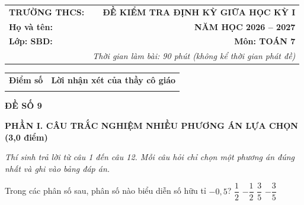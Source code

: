\documentclass[12pt,a4paper]{article}
\begin{document}
\noindent
\begin{tabularx}{\linewidth}{X r}
\textbf{TRƯỜNG THCS: \dotfill} & \textbf{ĐỀ KIỂM TRA ĐỊNH KỲ GIỮA HỌC KỲ I} \\
\textbf{Họ và tên: \dotfill} & \textbf{NĂM HỌC 2026 -- 2027} \\
\textbf{Lớp: \dotfill \quad SBD: \dotfill} & \textbf{Môn: TOÁN 7} \\
& \textit{Thời gian làm bài: 90 phút (không kể thời gian phát đề)}
\end{tabularx}

\vspace{1mm}
\noindent
\begin{tabularx}{\linewidth}{|p{3.5cm}|X|}
\hline
\centering\textbf{Điểm số} & \centering\textbf{Lời nhận xét của thầy cô giáo} \tabularnewline
\rule{0pt}{1.0cm} & \\
\hline
\end{tabularx}

\vspace{1.5mm}
\begin{center}
\textbf{\large ĐỀ SỐ 9}
\end{center}

\noindent\textbf{\large PHẦN I. CÂU TRẮC NGHIỆM NHIỀU PHƯƠNG ÁN LỰA CHỌN (3,0 điểm)}

\textit{Thí sinh trả lời từ câu 1 đến câu 12. Mỗi câu hỏi chỉ chọn một phương án đúng nhất và ghi vào bảng đáp án.}

\vspace{1mm}
\begin{ex}
Trong các phân số sau, phân số nào biểu diễn số hữu tỉ $-0{,}5$?
\choice
{$\dfrac{1}{2}$}
{\True $-\dfrac{1}{2}$}
{$\dfrac{3}{5}$}
{$-\dfrac{3}{5}$}
\end{ex}

\begin{ex}
\end{ex}
\end{document}
